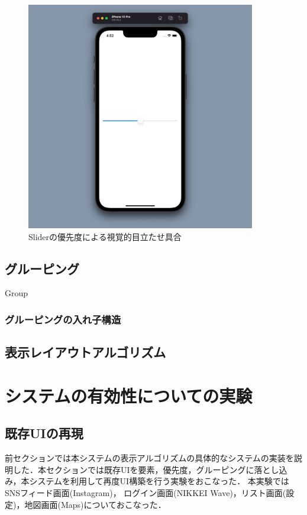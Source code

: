 \begin{figure}[htbp]
  \begin{minipage}{\hsize}
    \begin{center}
       \includegraphics[width=100mm]{img/Slider_priority.png}
    \end{center}
    \caption{Sliderの優先度による視覚的目立たせ具合}
    \label{fig:slider_priority}
  \end{minipage}
\end{figure}


\subsection{グルーピング}
Group
\subsubsection{グルーピングの入れ子構造}

\subsection{表示レイアウトアルゴリズム}

\section{システムの有効性についての実験}

\subsection{既存UIの再現}
前セクションでは本システムの表示アルゴリズムの具体的なシステムの実装を説明した．本セクションでは既存UIを要素，優先度，グルーピングに落とし込み，本システムを利用して再度UI構築を行う実験をおこなった．
本実験ではSNSフィード画面(Instagram)， ログイン画面(NIKKEI Wave)，リスト画面(設定)，地図画面(Maps)についておこなった．
